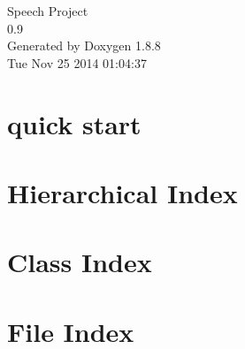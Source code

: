 \documentclass[twoside]{book}
\newcommand{\+}{\discretionary{\mbox{\scriptsize$\hookleftarrow$}}{}{}}
\newcommand{\clearemptydoublepage}{%
  \newpage{\pagestyle{empty}\cleardoublepage}%
}
\begin{document}
\hypersetup{pageanchor=false,
             bookmarks=true,
             bookmarksnumbered=true,
             pdfencoding=unicode
            }
\begin{titlepage}
\vspace*{7cm}
\begin{center}%
{\Large Speech Project \\[1ex]\large 0.\+9 }\\
\vspace*{1cm}
{\large Generated by Doxygen 1.8.8}\\
\vspace*{0.5cm}
{\small Tue Nov 25 2014 01:04:37}\\
\end{center}
\end{titlepage}
\clearemptydoublepage
\tableofcontents
\clearemptydoublepage
{}
\hypersetup{pageanchor=true}

\chapter{quick start}
\label{md__r_e_a_d_m_e}
\hypertarget{md__r_e_a_d_m_e}{}

\chapter{Hierarchical Index}

\chapter{Class Index}

\chapter{File Index}

\end{document}

